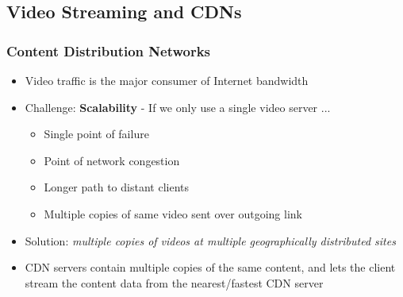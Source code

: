 \subsection{Video Streaming and CDNs}
\subsubsection{Content Distribution Networks}
\begin{itemize}
	\item Video traffic is the major consumer of Internet bandwidth
	\item Challenge: \textbf{Scalability} - If we only use a single video server ...
	\begin{itemize}
		\item Single point of failure
		\item Point of network congestion
		\item Longer path to distant clients
		\item Multiple copies of same video sent over outgoing link
	\end{itemize}
	\item Solution: \textit{multiple copies of videos at multiple geographically distributed sites}
	\item CDN servers contain multiple copies of the same content, and lets the client stream the content data from the nearest/fastest CDN server
\end{itemize}




